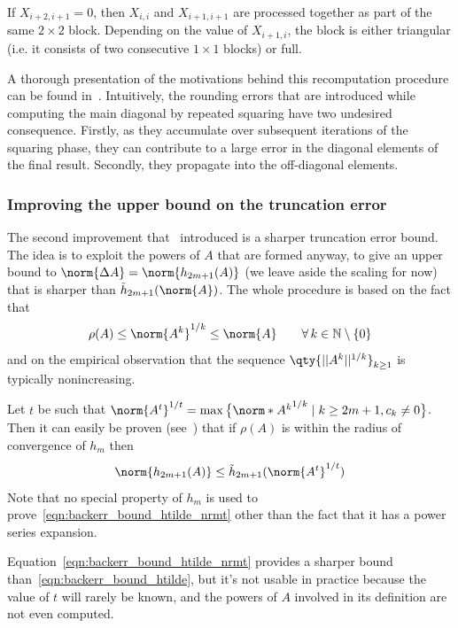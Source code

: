If $X_{i+2,i+1}=0$, then $X_{i,i}$ and $X_{i+1,i+1}$ are processed together as part of the same $2\times 2$ block. Depending on the value of $X_{i+1,i}$, the block is either triangular (i.e. it consists of two consecutive $1\times 1$ blocks) or full. 
\smallskip 

A thorough presentation of the motivations behind this recomputation procedure can be found in~\cite{higham:alhi09_new}. Intuitively, the rounding errors that are introduced while computing the main diagonal by repeated squaring have two undesired consequence. Firstly, as they accumulate over subsequent iterations of the squaring phase, they can contribute to a large error in the diagonal elements of the final result. Secondly, they propagate into the off-diagonal elements.

\subsubsection{Improving the upper bound on the truncation error}
The second improvement that~\cite{higham:alhi09_new} introduced is a sharper truncation error bound. The idea is to exploit the powers of $A$ that are formed anyway, to give an upper bound to $\norm{\Delta{A}}=\norm{h_{2m+1}(A)}$ (we leave aside the scaling for now) that is sharper than $\tilde{h}_{2m+1}(\norm{A})$. The whole procedure is based on the fact that
\[
	\rho(A)\le\norm{A^k}^{1/k}\le\norm{A}\qquad\forall\,k\in\mathbb{N}\setminus\{0\}
\]
and on the empirical observation that the sequence $\qty{\lvert\lvert A^k\rvert\rvert^{1/k}}_{k\ge 1}$ is typically nonincreasing.

Let $t$ be such that $\norm{A^t}^{1/t}=\max\big\{\norm*{A^k}^{1/k}\mid k\ge 2m+1, c_k\ne 0\big\}$. Then it can easily be proven (see~\cite[Thm.~1.1]{higham:alhi09_new}) that if $\rho(A)$ is within the radius of convergence of $h_m$ then
\begin{equation}\label{eqn:backerr_bound_htilde_nrmt}
	\norm{h_{2m+1}(A)}\le\tilde{h}_{2m+1}(\norm{A^t}^{1/t})
\end{equation}
Note that no special property of $h_m$ is used to prove~\eqref{eqn:backerr_bound_htilde_nrmt} other than the fact that it has a power series expansion. 

Equation~\eqref{eqn:backerr_bound_htilde_nrmt} provides a sharper bound than~\eqref{eqn:backerr_bound_htilde}, but it's not usable in practice because the value of $t$ will rarely be known, and the powers of $A$ involved in its definition are not even computed. 

